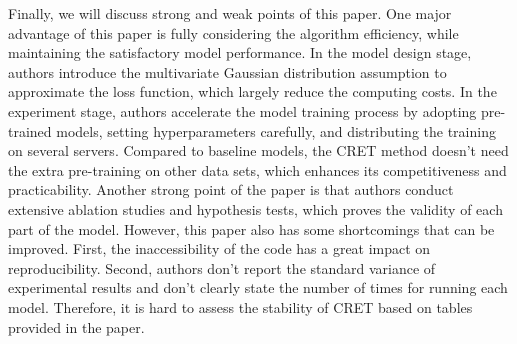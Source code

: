\documentclass{article}
\begin{document}
Finally, we will discuss strong and weak points of this paper. One major advantage of this paper is fully considering the algorithm efficiency, while maintaining the satisfactory model performance. In the model design stage, authors introduce the multivariate Gaussian distribution assumption to approximate the loss function, which largely reduce the computing costs. In the experiment stage, authors accelerate the model training process by adopting pre-trained models, setting hyperparameters carefully, and distributing the training on several servers. Compared to baseline models, the CRET method doesn't need the extra pre-training on other data sets, which enhances its competitiveness and practicability. Another strong point of the paper is that authors conduct extensive ablation studies and hypothesis tests, which proves the validity of each part of the model. However, this paper also has some shortcomings that can be improved. First, the inaccessibility of the code has a great impact on reproducibility. Second, authors don't report the standard variance of experimental results and don't clearly state the number of times for running each model. Therefore, it is hard to assess the stability of CRET based on tables provided in the paper.


\end{document}

